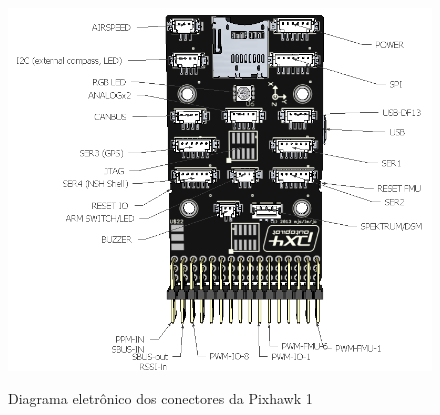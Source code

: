 \begin{figure}[htpb]
  \centering
  \caption{Diagrama eletrônico dos conectores da Pixhawk 1}
  \includegraphics[scale=.4]{figs/Diagrama eletronico pixhawk.png}
  \label{fig:pixhawkCirc}
\end{figure}

